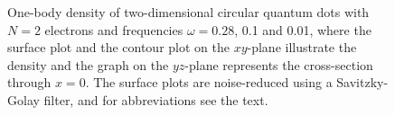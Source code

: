 \begin{figure}
	\hspace{0.1cm}
	\hspace{-0.cm}
	\hspace{-0.cm}
	
	\caption{One-body density of two-dimensional circular quantum dots with $N=2$ electrons and frequencies $\omega=0.28$, 0.1 and 0.01, where the surface plot and the contour plot on the $xy$-plane illustrate the density and the graph on the $yz$-plane represents the cross-section through $x=0$. The surface plots are noise-reduced using a Savitzky-Golay filter, and for abbreviations see the text.}
	\label{fig:lowfreq2P}
\end{figure}


